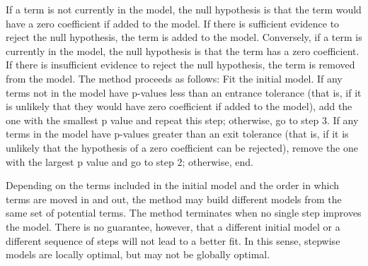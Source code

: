 If a term is not currently in the model, the null hypothesis is that the term would have a zero coefficient if added to the model. If there is sufficient evidence to reject the null hypothesis, the term is added to the model. Conversely, if a term is currently in the model, the null hypothesis is that the term has a zero coefficient. If there is insufficient evidence to reject the null hypothesis, the term is removed from the model. The method proceeds as follows:
Fit the initial model.
If any terms not in the model have p-values less than an entrance tolerance (that is, if it is unlikely that they would have zero coefficient if added to the model), add the one with the smallest p value and repeat this step; otherwise, go to step 3.
If any terms in the model have p-values greater than an exit tolerance (that is, if it is unlikely that the hypothesis of a zero coefficient can be rejected), remove the one with the largest p value and go to step 2; otherwise, end.

Depending on the terms included in the initial model and the order in which terms are moved in and out, the method may build different models from the same set of potential terms. The method terminates when no single step improves the model. There is no guarantee, however, that a different initial model or a different sequence of steps will not lead to a better fit. In this sense, stepwise models are locally optimal, but may not be globally optimal.
